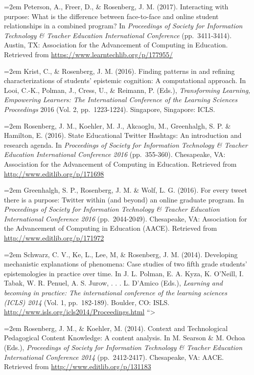 \documentclass[
  14,
]{article}
\begin{document}
\hangindent=2em Peterson, A., Freer, D., \& Rosenberg, J. M. (2017).
Interacting with purpose: What is the difference between face-to-face
and online student relationships in a combined program? In
\emph{Proceedings of Society for Information Technology \& Teacher
Education International Conference} (pp.~3411-3414). Austin, TX:
Association for the Advancement of Computing in Education. Retrieved
from \url{https://www.learntechlib.org/p/177955/}

\hangindent=2em Krist, C., \& Rosenberg, J. M. (2016). Finding patterns
in and refining characterizations of students' epistemic cognition: A
computational approach. In Looi, C.-K., Polman, J., Cress, U., \&
Reimann, P. (Eds.), \emph{Transforming Learning, Empowering Learners:
The International Conference of the Learning Sciences Proceedings} 2016
(Vol. 2, pp.~1223-1224). Singapore, Singapore: ICLS.

\hangindent=2em Rosenberg, J. M., Koehler, M. J., Akcaoglu, M.,
Greenhalgh, S. P. \& Hamilton, E. (2016). State Educational Twitter
Hashtags: An introduction and research agenda. In \emph{Proceedings of
Society for Information Technology \& Teacher Education International
Conference 2016} (pp.~355-360). Chesapeake, VA: Association for the
Advancement of Computing in Education. Retrieved from
\url{http://www.editlib.org/p/171698}

\hangindent=2em Greenhalgh, S. P., Rosenberg, J. M. \& Wolf, L. G.
(2016). For every tweet there is a purpose: Twitter within (and beyond)
an online graduate program. In \emph{Proceedings of Society for
Information Technology \& Teacher Education International Conference
2016} (pp.~2044-2049). Chesapeake, VA: Association for the Advancement
of Computing in Education (AACE). Retrieved from
\url{http://www.editlib.org/p/171972}

\hangindent=2em Schwarz, C. V., Ke, L., Lee, M, \& Rosenberg, J. M.
(2014). Developing mechanistic explanations of phenomena: Case studies
of two fifth grade students' epistemologies in practice over time. In J.
L. Polman, E. A. Kyza, K. O'Neill, I. Tabak, W. R. Penuel, A. S. Jurow,
. . . L. D'Amico (Eds.), \emph{Learning and becoming in practice: The
international conference of the learning sciences (ICLS) 2014} (Vol. 1,
pp.~182-189). Boulder, CO: ISLS.
\url{http://www.isls.org/icls2014/Proceedings.html} ``\textgreater{}

\hangindent=2em Rosenberg, J. M., \& Koehler, M. (2014). Context and
Technological Pedagogical Content Knowledge: A content analysis. In M.
Searson \& M. Ochoa (Eds.), \emph{Proceedings of Society for Information
Technology \& Teacher Education International Conference 2014}
(pp.~2412-2417). Chesapeake, VA: AACE. Retrieved from
\url{http://www.editlib.org/p/131183}
\end{document}
